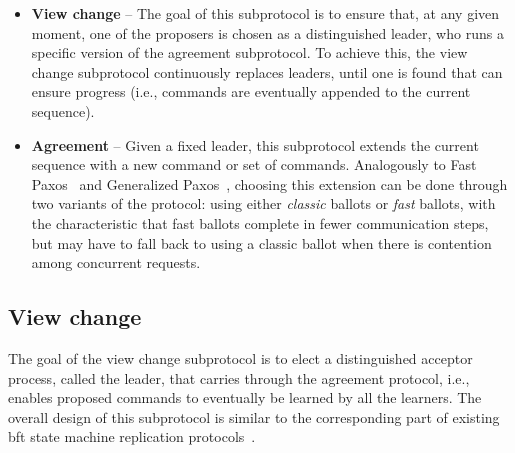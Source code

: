 \begin{itemize}
	
	\item
	{\bf View change} -- The goal of this subprotocol is to ensure that, at any given moment, one of the proposers is chosen as a distinguished leader, who runs a specific version of the agreement subprotocol. To achieve this, the view change subprotocol continuously replaces leaders, until one is found that can ensure progress (i.e., commands are eventually appended to the current sequence).
	
	\item
	{\bf Agreement} -- Given a fixed leader, this subprotocol extends the current sequence with a new command or set of commands. Analogously to Fast Paxos~\cite{Lamport2006} and Generalized Paxos~\cite{Lamport2005}, choosing this extension can be done through two variants of the protocol: using either \textit{classic} ballots or \textit{fast} ballots, with the characteristic that fast ballots complete in fewer communication steps, but may have to fall back to using a classic ballot when there is contention among concurrent requests.
	
\end{itemize}

\subsection{View change} 

The goal of the view change subprotocol is to elect a distinguished acceptor process, called the leader, that carries through the agreement protocol, i.e., enables proposed commands to eventually be learned by all the learners. The overall design of this subprotocol is similar to the corresponding part of existing \acrshort{bft} state machine replication protocols~\cite{CL99}.\par

